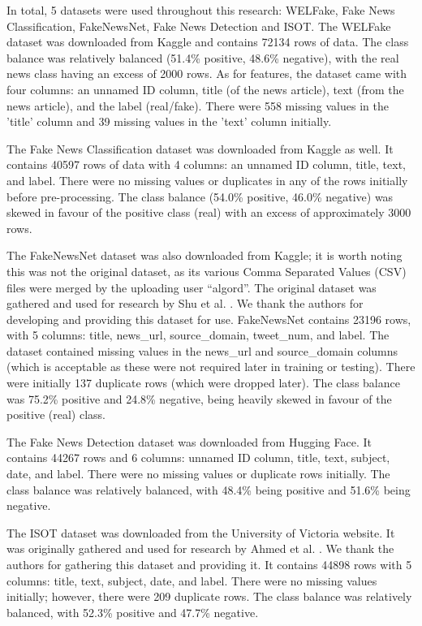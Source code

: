 \documentclass[
]{article}
\begin{document}
In total, 5 datasets were used throughout this research: WELFake, Fake News Classification, FakeNewsNet, Fake News Detection and ISOT. The WELFake dataset was downloaded from Kaggle and contains 72134 rows of data. The class balance was relatively balanced (51.4\% positive, 48.6\% negative), with the real news class having an excess of 2000 rows. As for features, the dataset came with four columns: an unnamed ID column, title (of the news article), text (from the news article), and the label (real/fake). There were 558 missing values in the 'title' column and 39 missing values in the 'text' column initially.

The Fake News Classification dataset was downloaded from Kaggle as well. It contains 40597 rows of data with 4 columns: an unnamed ID column, title, text, and label. There were no missing values or duplicates in any of the rows initially before pre-processing. The class balance (54.0\% positive, 46.0\% negative) was skewed in favour of the positive class (real) with an excess of approximately 3000 rows. 

The FakeNewsNet dataset was also downloaded from Kaggle; it is worth noting this was not the original dataset, as its various Comma Separated Values (CSV) files were merged by the uploading user ``algord''. The original dataset was gathered and used for research by Shu et al. \parencite{shu2018fakenewsnet,shu2017fake,shu2017exploiting}. We thank the authors for developing and providing this dataset for use. FakeNewsNet contains 23196 rows, with 5 columns: title, news\_url, source\_domain, tweet\_num, and label. The dataset contained missing values in the news\_url and source\_domain columns (which is acceptable as these were not required later in training or testing). There were initially 137 duplicate rows (which were dropped later). The class balance was 75.2\% positive and 24.8\% negative, being heavily skewed in favour of the positive (real) class. 

The Fake News Detection dataset was downloaded from Hugging Face. It contains 44267 rows and 6 columns: unnamed ID column, title, text, subject, date, and label. There were no missing values or duplicate rows initially. The class balance was relatively balanced, with 48.4\% being positive and 51.6\% being negative.

The ISOT dataset was downloaded from the University of Victoria website. It was originally gathered and used for research by Ahmed et al. \parencite{isot1,isot2}. We thank the authors for gathering this dataset and providing it. It contains 44898 rows with 5 columns: title, text, subject, date, and label. There were no missing values initially; however, there were 209 duplicate rows. The class balance was relatively balanced, with 52.3\% positive and 47.7\% negative. 
\end{document}
